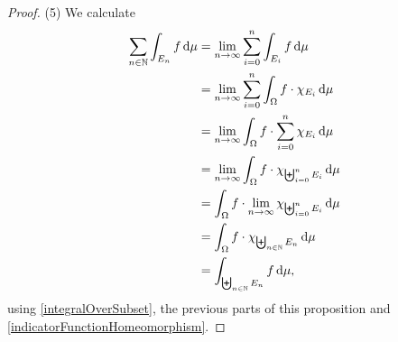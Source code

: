 \begin{proof}
(5) We calculate
\begin{align*}
\sum_{n\in \N}\int_{E_n}f\diff{\mu} &= \lim_{n\to \infty} \sum_{i=0}^n \int_{E_i}f \diff{\mu} \\
&= \lim_{n\to \infty} \sum_{i=0}^n \int_{\Omega}f\cdot\charFunc{E_i} \diff{\mu} \\
&= \lim_{n\to \infty} \int_{\Omega}f\cdot \sum_{i=0}^n\charFunc{E_i} \diff{\mu} \\
&= \lim_{n\to \infty} \int_{\Omega}f\cdot \charFunc{\biguplus_{i=0}^nE_i} \diff{\mu} \\
&= \int_{\Omega}f\cdot \lim_{n\to \infty}\charFunc{\biguplus_{i=0}^nE_i} \diff{\mu} \\
&= \int_{\Omega}f\cdot \charFunc{\biguplus_{n\in \N}E_n} \diff{\mu} \\
&= \int_{\biguplus_{n\in \N}E_n}f \diff{\mu},
\end{align*}
using \ref{integralOverSubset}, the previous parts of this proposition and \ref{indicatorFunctionHomeomorphism}.
\end{proof}


